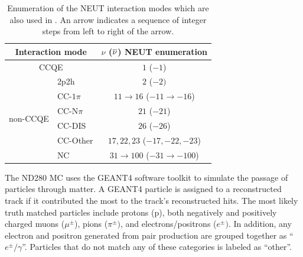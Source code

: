 \begin{table}
\caption[Enumeration of NEUT Interaction Modes]{Enumeration of the NEUT interaction modes which are also used in
. An arrow indicates a sequence of
integer steps from left to right of the arrow. \label{tab:NEUTReaction}}

\centering{}%
\begin{tabular}{clc}
\toprule 
\multicolumn{2}{c}{Interaction mode} & $\nu$ ($\overline{\nu}$) NEUT enumeration\tabularnewline
\midrule
\midrule 
\multicolumn{2}{c}{CCQE} & $1$ ($-1$)\tabularnewline
\midrule 
 & 2p2h & $2$ ($-2)$\tabularnewline
\cmidrule{2-3} \cmidrule{3-3} 
 & CC-$1\pi$ & $11\rightarrow16$ ($-11\rightarrow-16$)\tabularnewline
\cmidrule{2-3} \cmidrule{3-3} 
\multirow{2}{*}{non-CCQE} & CC-N$\pi$ & $21$ ($-21$)\tabularnewline
\cmidrule{2-3} \cmidrule{3-3} 
 & CC-DIS & $26$ ($-26$)\tabularnewline
\cmidrule{2-3} \cmidrule{3-3} 
 & CC-Other & $17,22,23$ ($-17,-22,-23$)\tabularnewline
\cmidrule{2-3} \cmidrule{3-3} 
 & NC & $31\rightarrow100$ ($-31\rightarrow-100$)\tabularnewline
\bottomrule
\end{tabular}
\end{table}

The ND280 MC uses the GEANT4 software toolkit \cite{Agostinelli:2002hh}
to simulate the passage of particles through matter. A GEANT4 particle
is assigned to a reconstructed track if it contributed the most to
the track's reconstructed hits. The most likely truth matched particles
include protons (p), both negatively and positively charged muons
($\mu^{\pm}$), pions ($\pi^{\pm})$, and electrons/positrons ($e^{\pm})$.
In addition, any electron and positron generated from pair production
are grouped together as ``$e^{\pm}/\gamma$''. Particles that do
not match any of these categories is labeled as ``other''.

